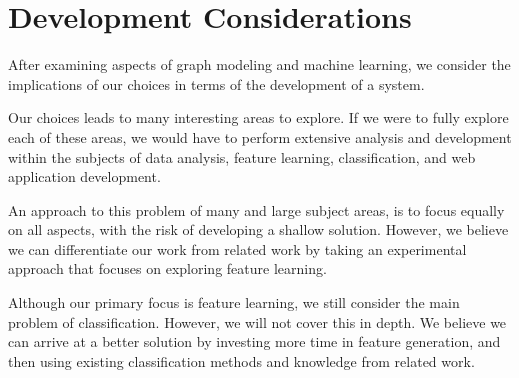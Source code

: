 \section{Development Considerations}
After examining aspects of graph modeling and machine learning, we consider the implications of our choices in terms of the development of a system.

Our choices leads to many interesting areas to explore. If we were to fully explore each of these areas, we would have to perform extensive analysis and development within the subjects of data analysis, feature learning, classification, and web application development.

An approach to this problem of many and large subject areas, is to focus equally on all aspects, with the risk of developing a shallow solution. However, we believe we can differentiate our work from related work by taking an experimental approach that focuses on exploring feature learning.



Although our primary focus is feature learning, we still consider the main problem of classification. However, we will not cover this in depth. We believe we can arrive at a better solution by investing more time in feature generation, and then using existing classification methods and knowledge from related work.

